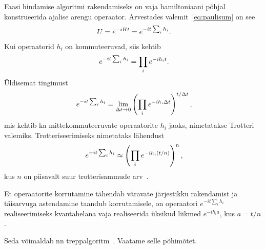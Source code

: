 \documentclass[12pt]{report}
\def\paren#1{\left(#1\right)}
\begin{document}
Faasi hindamise algoritmi rakendamiseks on vaja hamiltoniaani põhjal konstrueerida ajalise arengu operaator.
Arvestades valemit~\eqref{eq:paulisum} on see
\begin{align}
    U = e^{-iHt} = e^{-it\sum_i h_i} \rlap{.}
\end{align}
Kui operaatorid \(h_i\) on kommuteeruvad, siis kehtib
\begin{align}
    e^{-it\sum_i h_i} = \prod_i e^{-i h_i t} \rlap{.}
\end{align}
Üldisemat tingimust
\begin{align}
    e^{-it\sum_i h_i}
    = \lim_{\Delta t \rightarrow 0} \paren{\prod_i e^{-i h_i \Delta t}}^{t / \Delta t} \rlap{,}
\end{align}
mis kehtib ka mittekommuteeruvate operaatorite \(h_i\) jaoks, nimetatakse Trotteri valemiks.
Trotteriseerimiseks nimetataks lähendust
\begin{align}\label{eq:trot}
    e^{-it\sum_i h_i}
    \approx \paren{\prod_i e^{-i h_i (t / n)}}^n \rlap{,}
\end{align}
kus \(n\) on piisavalt suur trotterisammude arv~\cite{whitfield+etal2011, nielsen+chuang}.

Et operaatorite korrutamine tähendab väravate järjestikku rakendamist ja täisarvuga astendamine taandub korrutamisele, on operaatori \(e^{-i t \sum_i h_i}\) realiseerimiseks kvantahelana vaja realiseerida üksikud liikmed \(e^{-i h_i a}\), kus \(a = t / n\).

Seda võimaldab nn treppalgoritm~\cite{nielsen+chuang, mansky+etal}.
Vaatame selle põhimõtet.
\end{document}
